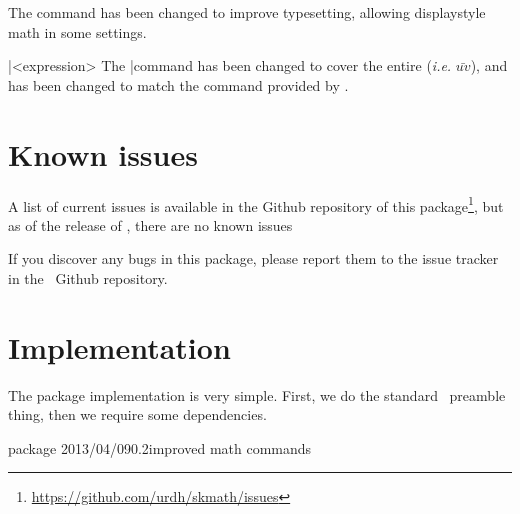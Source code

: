 \documentclass[commonsets,load]{skdoc}
\begin{document}
  \DescribeMacro{}
  The \Macro\frac command has been changed to improve typesetting,
  allowing displaystyle math in some settings.
 
  \DescribeMacro\bar{<expression>}
  \DescribeMacro{}
  The \Macro\bar command has been changed to cover the entire 
   (\emph{i.e.} \(\bar{uv}\)), and \Macro\vec has
  been changed to match the  command provided by 
  .

  \section{Known issues}
  A list of current issues is available in the Github repository of this
  package\footnote{\url{https://github.com/urdh/skmath/issues}}, but as
  of the release of \theversion, there are no known issues

  If you discover any bugs in this package, please report them to the issue
  tracker in the \thepackage\ Github repository.

  \Implementation\ExplHack
  \section{Implementation}
  The package implementation is very simple. First, we do the standard
  \LaTeXe\ preamble thing, then we require some dependencies.
\begin{MacroCode}{package}
\RequirePackage{expl3,l3keys2e,xparse}
    {2013/04/09}{0.2}{improved math commands}
\RequirePackage{amssymb,mathtools,xfrac,isomath}
\end{MacroCode}
\end{document}

